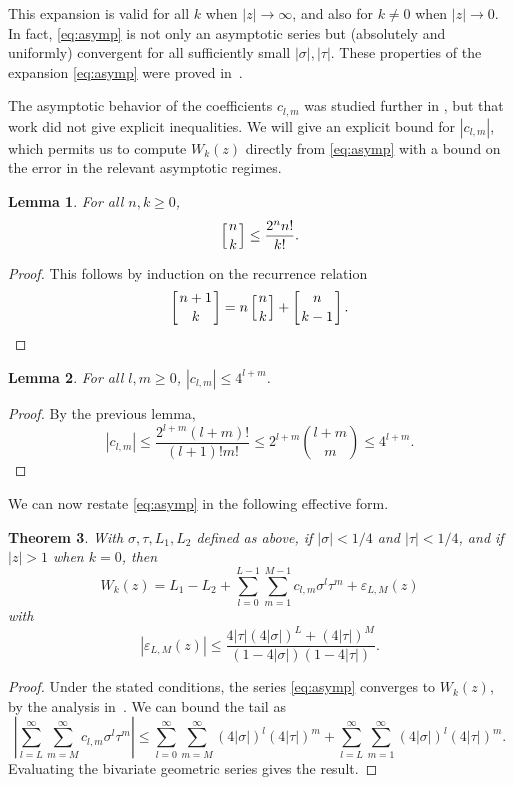 \documentclass[11pt,a4paper]{article}
\newtheorem{theorem}{Theorem}
\newtheorem{lemma}[theorem]{Lemma}
\begin{document}
This expansion is valid for all $k$ when $|z| \to \infty$,
and also for $k \ne 0$ when $|z| \to 0$. In fact, \eqref{eq:asymp}
is not only an asymptotic series but (absolutely and uniformly) convergent
for all sufficiently small $|\sigma|, |\tau|$.
These properties of the expansion \eqref{eq:asymp} were proved in~\cite{corless1996lambertw}.

The asymptotic behavior
of the coefficients  $c_{l,m}$ was
studied further in \cite{kalugin2012convergence}, but
that work did not give explicit inequalities.
We will give an explicit bound for $|c_{l,m}|$,
which permits us to compute $W_k(z)$ directly from \eqref{eq:asymp}
with a bound on the error
in the relevant asymptotic regimes.

\begin{lemma}
For all $n, k \ge 0$, $$\left[{n \atop k}\right] \le \frac{2^n n!}{k!}.$$
\end{lemma}
\begin{proof}
This follows by induction on the recurrence relation $$\left[{n+1 \atop k}\right] = n \left[{n \atop k}\right] + \left[{n \atop k-1}\right].$$
\end{proof}

\begin{lemma}
For all $l, m \ge 0$, $|c_{l,m}| \le 4^{l+m}$.
\end{lemma}
\begin{proof}
By the previous lemma, $$|c_{l,m}| \le \frac{2^{l+m} (l+m)!}{(l+1)! m!} \le 2^{l+m} {l+m \choose m} \le 4^{l+m}.$$
\end{proof}

We can now restate \eqref{eq:asymp} in the following
effective form.

\begin{theorem}
With $\sigma, \tau, L_1, L_2$ defined as above,
if $|\sigma| < 1/4$ and $|\tau| < 1/4$, and if $|z| > 1$ when $k = 0$, then
$$W_k(z) = L_1 - L_2 + \sum_{l=0}^{L-1} \sum_{m=1}^{M-1} c_{l,m} \sigma^l \tau^m + \varepsilon_{L,M}(z)$$
with
$$|\varepsilon_{L,M}(z)| \le \frac{4 |\tau| (4 |\sigma|)^L + (4 |\tau|)^M}{(1 - 4 |\sigma|)(1 - 4 |\tau|)}.$$
\end{theorem}
\begin{proof}
Under the stated conditions, the series \eqref{eq:asymp} converges to
$W_k(z)$, by the analysis in~\cite{corless1996lambertw}. We can bound the tail as
$$\left| \sum_{l=L}^{\infty} \sum_{m=M}^{\infty} c_{l,m} \sigma^l \tau^m \right| \le
\sum_{l=0}^{\infty} \sum_{m=M}^{\infty} (4 |\sigma|)^l (4 |\tau|)^m +
\sum_{l=L}^{\infty} \sum_{m=1}^{\infty} (4 |\sigma|)^l (4 |\tau|)^m.$$
Evaluating the bivariate geometric series gives the result.
\end{proof}
\end{document}

